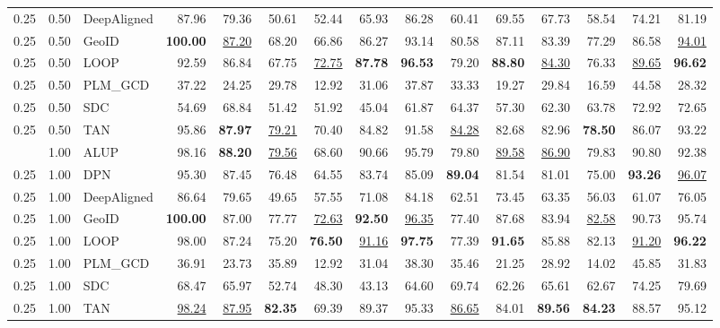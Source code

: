 \begin{table}[t]
{\begin{tabular}{lllrrrrrrrrrrrr}
0.25 & 0.50 & DeepAligned & 87.96 & 79.36 & 50.61 & 52.44 & 65.93 & 86.28 & 60.41 & 69.55 & 67.73 & 58.54 & 74.21 & 81.19 \\
0.25 & 0.50 & GeoID & \textbf{100.00} & \underline{87.20} & 68.20 & 66.86 & 86.27 & 93.14 & 80.58 & 87.11 & 83.39 & 77.29 & 86.58 & \underline{94.01} \\
0.25 & 0.50 & LOOP & 92.59 & 86.84 & 67.75 & \underline{72.75} & \textbf{87.78} & \textbf{96.53} & 79.20 & \textbf{88.80} & \underline{84.30} & 76.33 & \underline{89.65} & \textbf{96.62} \\
0.25 & 0.50 & PLM_GCD & 37.22 & 24.25 & 29.78 & 12.92 & 31.06 & 37.87 & 33.33 & 19.27 & 29.84 & 16.59 & 44.58 & 28.32 \\
0.25 & 0.50 & SDC & 54.69 & 68.84 & 51.42 & 51.92 & 45.04 & 61.87 & 64.37 & 57.30 & 62.30 & 63.78 & 72.92 & 72.65 \\
0.25 & 0.50 & TAN & 95.86 & \textbf{87.97} & \underline{79.21} & 70.40 & 84.82 & 91.58 & \underline{84.28} & 82.68 & 82.96 & \textbf{78.50} & 86.07 & 93.22 \\
\addlinespace
0.25 & 1.00 & ALUP & 98.16 & \textbf{88.20} & \underline{79.56} & 68.60 & 90.66 & 95.79 & 79.80 & \underline{89.58} & \underline{86.90} & 79.83 & 90.80 & 92.38 \\
0.25 & 1.00 & DPN & 95.30 & 87.45 & 76.48 & 64.55 & 83.74 & 85.09 & \textbf{89.04} & 81.54 & 81.01 & 75.00 & \textbf{93.26} & \underline{96.07} \\
0.25 & 1.00 & DeepAligned & 86.64 & 79.65 & 49.65 & 57.55 & 71.08 & 84.18 & 62.51 & 73.45 & 63.35 & 56.03 & 61.07 & 76.05 \\
0.25 & 1.00 & GeoID & \textbf{100.00} & 87.00 & 77.77 & \underline{72.63} & \textbf{92.50} & \underline{96.35} & 77.40 & 87.68 & 83.94 & \underline{82.58} & 90.73 & 95.74 \\
0.25 & 1.00 & LOOP & 98.00 & 87.24 & 75.20 & \textbf{76.50} & \underline{91.16} & \textbf{97.75} & 77.39 & \textbf{91.65} & 85.88 & 82.13 & \underline{91.20} & \textbf{96.22} \\
0.25 & 1.00 & PLM_GCD & 36.91 & 23.73 & 35.89 & 12.92 & 31.04 & 38.30 & 35.46 & 21.25 & 28.92 & 14.02 & 45.85 & 31.83 \\
0.25 & 1.00 & SDC & 68.47 & 65.97 & 52.74 & 48.30 & 43.13 & 64.60 & 69.74 & 62.26 & 65.61 & 62.67 & 74.25 & 79.69 \\
0.25 & 1.00 & TAN & \underline{98.24} & \underline{87.95} & \textbf{82.35} & 69.39 & 89.37 & 95.33 & \underline{86.65} & 84.01 & \textbf{89.56} & \textbf{84.23} & 88.57 & 95.12 \\

\end{tabular}}
\end{table}
